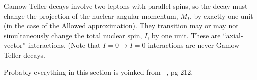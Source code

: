 	Gamow-Teller decays involve two leptons with parallel spins, so the decay must change the projection of the nuclear angular momentum, $M_I$, by exactly one unit (in the case of the Allowed approximation).  They transition may or may not simultaneously change the total nuclear spin, $I$, by one unit.  These are ``axial-vector'' interactions.  (Note that $I=0 \rightarrow I=0$ interactions are never Gamow-Teller decays.  
	
	Probably everything in this section is yoinked from ~\cite{wong1990}, pg 212.  
	
	
%	
%	
%	
%
%
%
%
%
%
